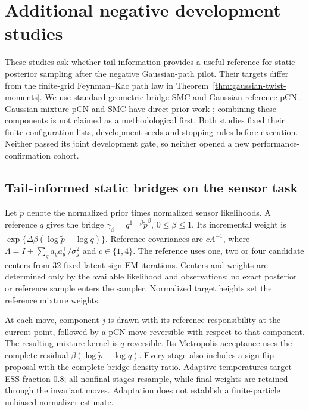 \section{Additional negative development studies}\label{app:continued-iteration}

These studies ask whether tail information provides a useful reference for static posterior sampling after the negative Gaussian-path pilot. Their targets differ from the finite-grid Feynman--Kac path law in Theorem~\ref{thm:gaussian-twist-moments}. We use standard geometric-bridge SMC and Gaussian-reference pCN \citep{delmoral2006,cotter2013}. Gaussian-mixture pCN and SMC have direct prior work \citep{lu2025}; combining these components is not claimed as a methodological first. Both studies fixed their finite configuration lists, development seeds and stopping rules before execution. Neither passed its joint development gate, so neither opened a new performance-confirmation cohort.

\subsection{Tail-informed static bridges on the sensor task}

Let $\widetilde p$ denote the normalized prior times normalized sensor likelihoods. A reference $q$ gives the bridge $\gamma_\beta=q^{1-\beta}\widetilde p^\beta$, $0\leq\beta\leq1$. Its incremental weight is $\exp\{\Delta\beta(\log\widetilde p-\log q)\}$. Reference covariances are $c\Lambda^{-1}$, where $\Lambda=I+\sum_ga_ga_g^\top/\sigma_g^2$ and $c\in\{1,4\}$. The reference uses one, two or four candidate centers from 32 fixed latent-sign EM iterations. Centers and weights are determined only by the available likelihood and observations; no exact posterior or reference sample enters the sampler. Normalized target heights set the reference mixture weights.

At each move, component $j$ is drawn with its reference responsibility at the current point, followed by a pCN move reversible with respect to that component. The resulting mixture kernel is $q$-reversible. Its Metropolis acceptance uses the complete residual $\beta(\log\widetilde p-\log q)$. Every stage also includes a sign-flip proposal with the complete bridge-density ratio. Adaptive temperatures target ESS fraction $0.8$; all nonfinal stages resample, while final weights are retained through the invariant moves. Adaptation does not establish a finite-particle unbiased normalizer estimate.

